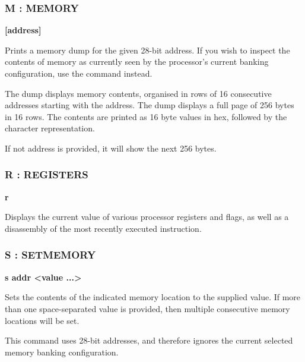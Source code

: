 \subsubsection{M : MEMORY}
\begin{description}[leftmargin=2cm,style=nextline]
\item [Format:] {\bf <m|M> [address]}
\item [Usage:] Prints a memory dump for the given 28-bit address.
  If you wish to inspect the contents of memory as currently seen
  by the processor's current banking configuration, use the \@
  command instead.

  The dump displays memory contents, organised in rows
  of 16 consecutive addresses starting with the
  address. The dump displays
  a full page of 256 bytes in 16 rows.
  The contents are printed as 16 byte values in hex,
  followed by the character representation.

\item [Remarks:] If not address is provided, it will show the next 256 bytes.

\end{description}

\subsubsection{R : REGISTERS}
\begin{description}[leftmargin=2cm,style=nextline]
\item [Format:] {\bf r}
\item [Usage:] Displays the current value of various processor registers
  and flags, as well as a disassembly of the most recently executed
  instruction.

\end{description}

\subsubsection{S : SETMEMORY}
\begin{description}[leftmargin=2cm,style=nextline]
\item [Format:] {\bf s addr <value ...>}
\item [Usage:] Sets the contents of the indicated memory location to the supplied value.
  If more than one space-separated value is provided, then multiple consecutive memory
  locations will be set.

  This command uses 28-bit addresses, and therefore ignores the current selected memory banking
  configuration.

\end{description}


